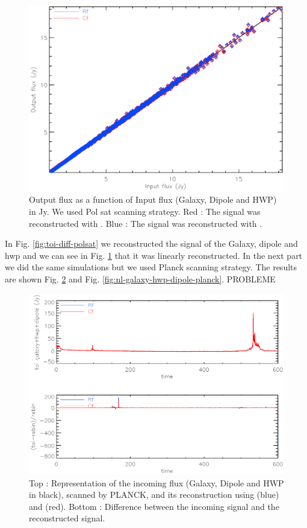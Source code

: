 \begin{figure}[h]
\center
	\includegraphics[scale=0.5]{Figures/NL-galaxy-hwp-dipole-polsat.eps}
	\caption{Output flux as a function of Input flux (Galaxy, Dipole and HWP) in Jy. We used Pol sat scanning strategy. Red : The signal was reconstructed with \cf. Blue : The signal was reconstructed with \rf.}
	\label{fig:nl-galaxy-hwp-dipole-polsat}
\end{figure}

In Fig. \ref{fig:toi-diff-polsat} we reconstructed the signal of the Galaxy, dipole and hwp and we can see in Fig. \ref{fig:nl-galaxy-hwp-dipole-polsat} that it was linearly reconstructed. 
In the next part we did the same simulations but we used Planck scanning strategy. The results are shown Fig. \ref{fig:toi-diff-planck} and Fig. \ref{fig:nl-galaxy-hwp-dipole-planck}. PROBLEME

\begin{figure}[h]
\center
	\includegraphics[scale=0.5]{Figures/toi-diff-planck.eps}
	\caption{Top : Representation of the incoming flux (Galaxy, Dipole and HWP in black), scanned by PLANCK, and its reconstruction using \rf (blue) and \cf (red). Bottom : Difference between the incoming signal and the reconstructed signal. }
	\label{fig:toi-diff-planck}
\end{figure}

